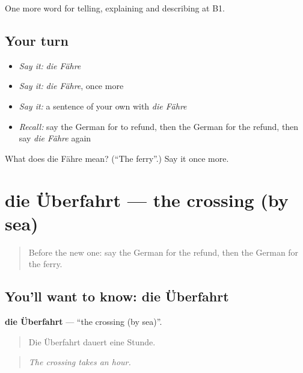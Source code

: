 \begin{grammarlens}[title={What you've built}]
One more word for telling, explaining and describing at B1.
\end{grammarlens}

\subsection*{Your turn}
\begin{itemize}
\raggedright
  \item \emph{Say it:} \emph{die Fähre}
  \item \emph{Say it:} \emph{die Fähre}, once more
  \item \emph{Say it:} a sentence of your own with \emph{die Fähre}
  \item \emph{Recall:} say the German for to refund, then the German for the refund, then say \emph{die Fähre} again
\end{itemize}

\begin{tcolorbox}[breakable,colback=teal!4,colframe=teal!35!black,title={Before you move on}]
What does die Fähre mean? (\textquotedblleft{}The ferry\textquotedblright{}.) Say it once more.
\end{tcolorbox}
\section[die Überfahrt]{die Überfahrt — the crossing (by sea)}

\label{lesson:GE-C421-ueberfahrt}



\begin{quote}
Before the new one: say the German for the refund, then the German for the ferry.
\end{quote}

\subsection*{You'll want to know: die Überfahrt}
\textbf{die Überfahrt} — \textquotedblleft{}the crossing (by sea)\textquotedblright{}.

\begin{quote}
Die Überfahrt dauert eine Stunde.
\end{quote}

\begin{quote}
\emph{The crossing takes an hour.}
\end{quote}

